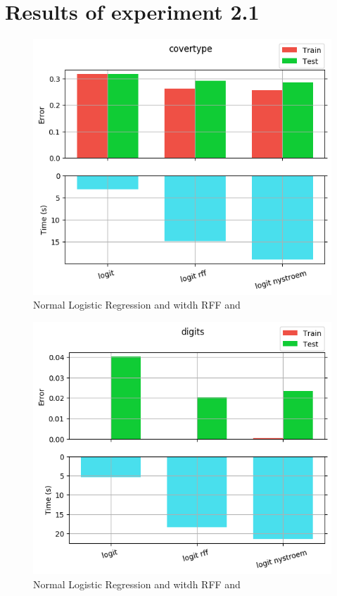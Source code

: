 
\chapter{Results of experiment 2.1} %

\label{Appendix2-1} %

\begin{figure}[th]
\centering
\includegraphics[scale=\imgscale]{Figures/2_1/covertype}
\decoRule
\caption[2.1 covertype]{Normal Logistic Regression and witdh RFF and \Nys}
\label{fig:2_1_covertype}
\end{figure}

\begin{figure}[th]
\centering
\includegraphics[scale=\imgscale]{Figures/2_1/digits}
\decoRule
\caption[2.1 digits]{Normal Logistic Regression and witdh RFF and \Nys}
\label{fig:2_1_digits}
\end{figure}

